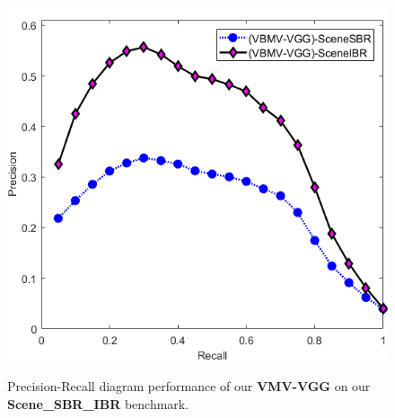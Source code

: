 \documentclass[times, 10pt,twocolumn]{article}
\begin{document}



\begin{figure}[htb]
\centering
{
\includegraphics[height=0.82\linewidth]{comparative}
}
\caption{Precision-Recall diagram performance of our \textbf{VMV-VGG} on our \textbf{Scene\_SBR\_IBR} benchmark.}
\label{fig:sbr18prperf}
\end{figure}
\end{document}

